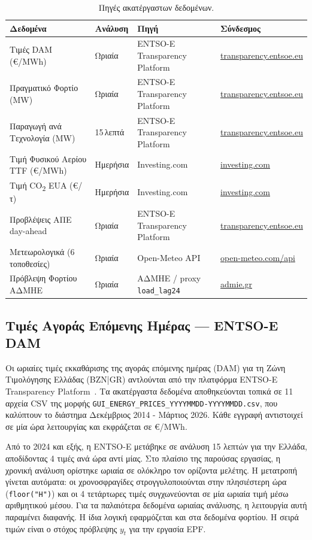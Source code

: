 \begin{table}[htbp]
\centering
\caption{Πηγές ακατέργαστων δεδομένων.}
\label{tab:data_sources}
\small
\begin{tabular}{p{3.8cm}p{2cm}p{3.2cm}p{4.1cm}}
\toprule
Δεδομένα & Ανάλυση & Πηγή & Σύνδεσμος \\
\midrule
Τιμές DAM (€/MWh) & Ωριαία & ENTSO-E Transparency Platform~\cite{entsoe_transparency} & \url{transparency.entsoe.eu} \\
Πραγματικό Φορτίο (MW) & Ωριαία & ENTSO-E Transparency Platform~\cite{entsoe_transparency} & \url{transparency.entsoe.eu} \\
Παραγωγή ανά Τεχνολογία (MW) & 15\,λεπτά & ENTSO-E Transparency Platform~\cite{entsoe_transparency} & \url{transparency.entsoe.eu} \\
Τιμή Φυσικού Αερίου TTF (€/MWh) & Ημερήσια & Investing.com~\cite{ttf_gas} & \url{investing.com} \\
Τιμή CO\textsubscript{2} EUA (€/τ) & Ημερήσια & Investing.com~\cite{co2_ets} & \url{investing.com} \\
Προβλέψεις ΑΠΕ day-ahead & Ωριαία & ENTSO-E Transparency Platform~\cite{entsoe_transparency} & \url{transparency.entsoe.eu} \\
Μετεωρολογικά (6 τοποθεσίες) & Ωριαία & Open-Meteo API~\cite{openmeteo} & \url{open-meteo.com/api} \\
Πρόβλεψη Φορτίου ΑΔΜΗΕ & Ωριαία & ΑΔΜΗΕ / proxy \texttt{load\_lag24} & \url{admie.gr} \\
\bottomrule
\end{tabular}
\end{table}

\subsection{Τιμές Αγοράς Επόμενης Ημέρας — ENTSO-E DAM}

Οι ωριαίες τιμές εκκαθάρισης της αγοράς επόμενης ημέρας (DAM) για τη Ζώνη Τιμολόγησης
Ελλάδας (BZN|GR) αντλούνται από την πλατφόρμα ENTSO-E Transparency
Platform~\cite{entsoe_transparency}. Τα ακατέργαστα δεδομένα αποθηκεύονται τοπικά σε 11
αρχεία CSV της μορφής \texttt{GUI\_ENERGY\_PRICES\_YYYYMMDD-YYYYMMDD.csv}, που
καλύπτουν το διάστημα Δεκέμβριος 2014 - Μάρτιος 2026. Κάθε εγγραφή αντιστοιχεί σε μία
ώρα λειτουργίας και εκφράζεται σε €/MWh.

Από το 2024 και εξής, η ENTSO-E μετάβηκε σε ανάλυση 15 λεπτών για την Ελλάδα, αποδίδοντας
4 τιμές ανά ώρα αντί μίας. Στο πλαίσιο της παρούσας εργασίας, η χρονική ανάλυση ορίστηκε
ωριαία σε ολόκληρο τον ορίζοντα μελέτης. Η μετατροπή γίνεται αυτόματα: οι χρονοσφραγίδες
στρογγυλοποιούνται στην πλησιέστερη ώρα (\texttt{floor("H")}) και οι 4 τετάρτωρες τιμές
συγχωνεύονται σε μία ωριαία τιμή μέσω αριθμητικού μέσου. Για τα παλαιότερα δεδομένα
ωριαίας ανάλυσης, η λειτουργία αυτή παραμένει διαφανής. Η ίδια λογική εφαρμόζεται και στα
δεδομένα φορτίου. Η σειρά τιμών είναι ο στόχος πρόβλεψης $y_t$ για την εργασία EPF.


